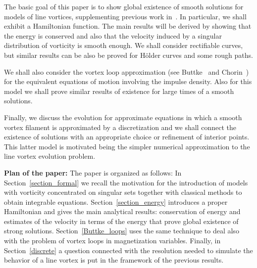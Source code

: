 \documentclass[a4paper,11pt]{article}
\numberwithin{equation}{section}
\begin{document}
The basic goal of this paper is to show global existence of smooth
solutions for models of line vortices, supplementing previous work
in~\cite{bb}. %
In particular, we shall exhibit a Hamiltonian function. 
The main results will be derived by showing that the energy is
conserved and also that the velocity induced by a singular
distribution of vorticity is smooth enough. We shall consider
rectifiable curves, but similar results can be also be proved for
H\"older curves and some rough paths.\par 
%
We shall also consider the vortex loop approximation (see
Buttke~\cite{MR1248421} and Chorin~\cite{MR95m:76043}) for the
equivalent equations of motion involving the impulse density. Also for
this model we shall prove similar results of existence for large times
of a smooth solutions.\par    
%
Finally, we discuss the evolution for approximate
equations in which a smooth vortex filament is approximated by a
discretization and we shall connect the existence of solutions with an
appropriate choice or refinement of 
interior points. This latter model is motivated being the simpler
numerical approximation to the line vortex evolution problem.

\vspace{.5cm}
\noindent\textbf{Plan of the paper:} The paper is organized as
follows: In Section~\ref{section_formal} we recall the motivation for
the introduction of models with vorticity concentrated on singular
sets together with classical methods to obtain integrable
equations. Section~\ref{section_energy} introduces a proper
Hamiltonian and gives the main analytical results: conservation of
energy and estimates of the velocity in terms of the energy that
prove global existence of strong solutions. Section~\ref{Buttke_loops}
uses the same technique to deal also with the problem of vortex loops
in magnetization variables. Finally, in Section~\ref{discrete} a
question connected with the resolution needed to simulate the behavior
of a line vortex is put in the framework of the previous results. 
\end{document}
